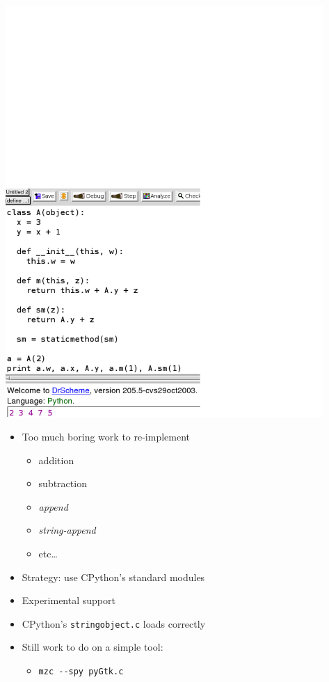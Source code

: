 \documentclass[landscape,20pt,dvips]{foils}
\newcommand{\jhead}[1]{\foilhead{\flushleft \textcolor{vinho}{\large   #1}
\vspace{-0.84cm} \\ {\color{black} --------------------------------------------------------------- }}}
\begin{document}
\begin{center}
\includegraphics[height=15.65cm]{figures/spy-class-with-staticmethod-oct-30-2003}
\end{center}
\jhead{Status: Runtime Library}
  \begin{itemize}
    \item Too much boring work to re-implement
      \begin{itemize}
        \item addition
        \item subtraction
        \item \emph{append}
        \item \emph{string-append}
        \item etc\ldots
      \end{itemize}
    \item Strategy: use CPython's standard modules
  \end{itemize}
\jhead{Status: C Extensions}
  \begin{itemize}
    \item Experimental support
    \item CPython's \verb|stringobject.c| loads correctly
    \item Still work to do on a simple tool:
    \begin{itemize}
      \item \verb|mzc --spy pyGtk.c|
    \end{itemize}
  \end{itemize}
\end{document}
